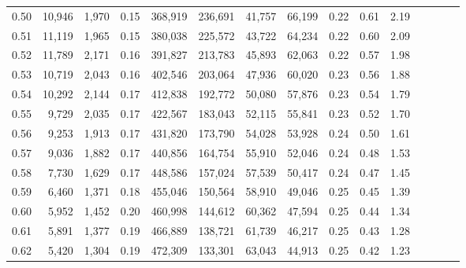 \begin{tabular}{rrrcrrrrrrrrrrr}
0.50 &  10,946 &  1,970 &                                       0.15 &  368,919 &  236,691 &   41,757 &   66,199 &  0.22 &  0.61 &                         2.19 \\
0.51 &  11,119 &  1,965 &                                       0.15 &  380,038 &  225,572 &   43,722 &   64,234 &  0.22 &  0.60 &                         2.09 \\
0.52 &  11,789 &  2,171 &                                       0.16 &  391,827 &  213,783 &   45,893 &   62,063 &  0.22 &  0.57 &                         1.98 \\
0.53 &  10,719 &  2,043 &                                       0.16 &  402,546 &  203,064 &   47,936 &   60,020 &  0.23 &  0.56 &                         1.88 \\
0.54 &  10,292 &  2,144 &                                       0.17 &  412,838 &  192,772 &   50,080 &   57,876 &  0.23 &  0.54 &                         1.79 \\
0.55 &   9,729 &  2,035 &                                       0.17 &  422,567 &  183,043 &   52,115 &   55,841 &  0.23 &  0.52 &                         1.70 \\
0.56 &   9,253 &  1,913 &                                       0.17 &  431,820 &  173,790 &   54,028 &   53,928 &  0.24 &  0.50 &                         1.61 \\
0.57 &   9,036 &  1,882 &                                       0.17 &  440,856 &  164,754 &   55,910 &   52,046 &  0.24 &  0.48 &                         1.53 \\
0.58 &   7,730 &  1,629 &                                       0.17 &  448,586 &  157,024 &   57,539 &   50,417 &  0.24 &  0.47 &                         1.45 \\
0.59 &   6,460 &  1,371 &                                       0.18 &  455,046 &  150,564 &   58,910 &   49,046 &  0.25 &  0.45 &                         1.39 \\
0.60 &   5,952 &  1,452 &                                       0.20 &  460,998 &  144,612 &   60,362 &   47,594 &  0.25 &  0.44 &                         1.34 \\
0.61 &   5,891 &  1,377 &                                       0.19 &  466,889 &  138,721 &   61,739 &   46,217 &  0.25 &  0.43 &                         1.28 \\
0.62 &   5,420 &  1,304 &                                       0.19 &  472,309 &  133,301 &   63,043 &   44,913 &  0.25 &  0.42 &                         1.23 \\

\end{tabular}
